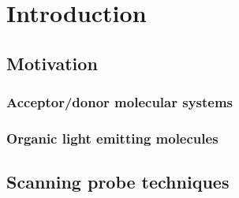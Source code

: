 
\chapter{Introduction}
\label{ch:Introduction}

\section{Motivation}

\subsection{Acceptor/donor molecular systems}


\subsection{Organic light emitting molecules}


\section{Scanning probe techniques}







